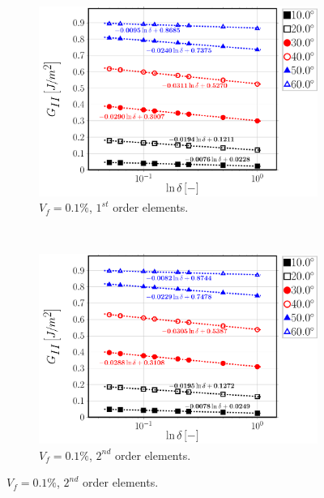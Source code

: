 \begin{figure}[!h]
\centering
    \begin{subfigure}[b]{0.45\textwidth}
        \includegraphics[width=\textwidth]{paperA/Vf0_1-free-1st-semilogvsDelta-GII.pdf}
       \caption{$V_{f}=0.1\%$, $1^{st}$ order elements.}
    \end{subfigure}
    ~
    \begin{subfigure}[b]{0.45\textwidth}
        \includegraphics[width=\textwidth]{paperA/Vf0_1-free-2nd-semilogvsDelta-GII.pdf}
       \caption{$V_{f}=0.1\%$, $2^{nd}$ order elements.}
    \end{subfigure}


\end{figure}
